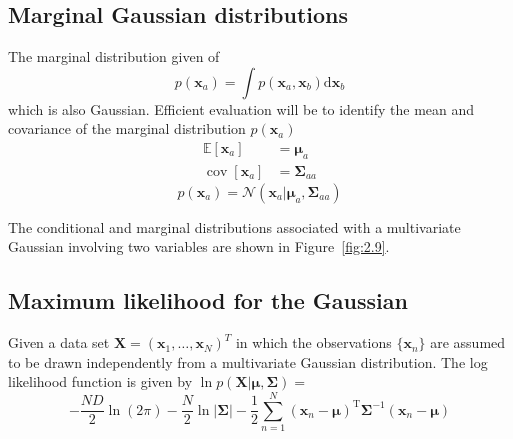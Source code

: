 \documentclass[5p,sort&compress]{elsarticle}
\begin{document}
\subsection{Marginal Gaussian distributions}

The marginal distribution given of 
\begin{equation}
p\left(\mathbf{x}_{a}\right)=\int p\left(\mathbf{x}_{a}, \mathbf{x}_{b}\right) \mathrm{d} \mathbf{x}_{b}
\end{equation}
which is also Gaussian. Efficient evaluation will be to identify the mean and covariance of the marginal distribution $p(\textbf{x}_a)$
\begin{equation}
\begin{aligned} \mathbb{E}\left[\mathbf{x}_{a}\right] &=\boldsymbol{\mu}_{a} \\ \operatorname{cov}\left[\mathbf{x}_{a}\right] &=\boldsymbol{\Sigma}_{a a} \end{aligned}
\end{equation}
\begin{equation}
p\left(\mathbf{x}_{a}\right)=\mathcal{N}\left(\mathbf{x}_{a} | \boldsymbol{\mu}_{a}, \mathbf{\Sigma}_{a a}\right)
\end{equation}

The conditional and marginal distributions associated with
a multivariate Gaussian involving two variables are shown in Figure~\ref{fig:2.9}.

\subsection{Maximum likelihood for the Gaussian}

Given a data set $\boldsymbol{X} = (\boldsymbol{x}_1, \ldots, \boldsymbol{x}_N)^T$ in which the observations $\{\boldsymbol{x}_n\}$ are assumed to be drawn independently from a multivariate Gaussian distribution. The log likelihood function is given by $\ln p(\mathbf{X} | \boldsymbol{\mu}, \mathbf{\Sigma}) = $
\begin{equation}
-\frac{N D}{2} \ln (2 \pi) -\frac{N}{2} \ln |\mathbf{\Sigma}|-\frac{1}{2} \sum_{n=1}^{N}\left(\mathbf{x}_{n}-\boldsymbol{\mu}\right)^{\mathrm{T}} \mathbf{\Sigma}^{-1}\left(\mathbf{x}_{n}-\boldsymbol{\mu}\right)
\end{equation}
\end{document}
